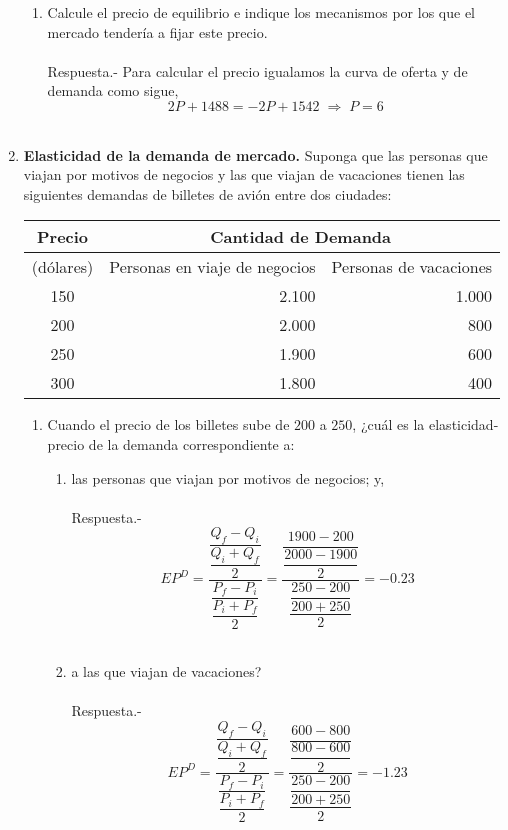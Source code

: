 \begin{enumerate}
\begin{enumerate}[\bfseries a.]
	    \item Calcule el precio de equilibrio e indique los mecanismos por los que el mercado tendería a fijar este precio.\\\\
		Respuesta.-\; Para calcular el precio igualamos la curva de oferta y de demanda como sigue, $$2P+1488 = -2P+1542 \; \Longrightarrow \; P=6$$\\

	\end{enumerate}

    \item \textbf{Elasticidad de la demanda de mercado.} Suponga que las personas que viajan por motivos de negocios y las que viajan de vacaciones tienen las siguientes demandas de billetes de avión entre dos ciudades:
	\begin{center}
	    \begin{tabular}{|c|r|r|}
		\hline
		\hline
		Precio&\multicolumn{2}{c|}{Cantidad de Demanda} \\ \hline
		(dólares)&Personas en viaje de negocios&Personas de vacaciones\\
		\hline
		150&2.100&1.000\\
		200&2.000&800\\
		250&1.900&600\\
		300&1.800&400\\
		\hline
		\hline
	    \end{tabular}
	\end{center}

	\begin{enumerate}[\bfseries a.]

	    \item Cuando el precio de los billetes sube de $200$ a $250$, ¿cuál es la elasticidad-precio de la demanda correspondiente a:

		\begin{enumerate}[\bfseries (i)]
		    
		    \item las personas que viajan por motivos de negocios; y,\\\\
			Respuesta.-\; $$EP^D = \dfrac{\dfrac{Q_f-Q_i}{\dfrac{Q_i+Q_f}{2}}}{\dfrac{P_f-P_i}{\dfrac{P_i+P_f}{2}}}=\dfrac{\dfrac{1900-200}{\dfrac{2000-1900}{2}}}{\dfrac{\dfrac{250-200}{200+250}}{2}}=-0.23$$ \\

		    \item a las que viajan de vacaciones?\\\\
			Respuesta.-\; $$EP^D = \dfrac{\dfrac{Q_f-Q_i}{\dfrac{Q_i+Q_f}{2}}}{\dfrac{P_f-P_i}{\dfrac{P_i+P_f}{2}}}=\dfrac{\dfrac{600-800}{\dfrac{800-600}{2}}}{\dfrac{\dfrac{250-200}{200+250}}{2}}=-1.23$$\\


\end{enumerate}
\end{enumerate}
\end{enumerate}
